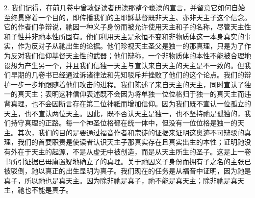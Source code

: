 2. 我们记得，在前几卷中曾敦促读者研读那整个亵渎的宣言，并留意它如何自始至终贯穿着一个目的，即传播我们的主耶稣基督既非天主、亦非天主子这个信念。它的作者们争辩说，祂因一种义子身份而被允许使用天主和子的名称，尽管天主性和子性并非祂本性所固有。他们利用天主是永恒不变和非物质体这一本身真实的事实，作为反对子从祂出生的论据。他们珍视天主圣父是独一的那真理，只是为了作为反对我们信仰基督天主性的武器；他们辩称，一个非物质体的本性不能被合理地设想为产生另一个，并且我们信独一天主与宣认来自天主的天主是不一致的。但我们早期的几卷书已经通过诉诸律法和先知驳斥并挫败了他们的这个论点。我们的辩护一步一步地跟随着他们攻击的进程。我们陈述了来自天主的天主，同时宣认了独一的真天主；表明这种信仰表述既不会因为将单独一位位格归于独一的真天主而违背真理，也不会因断言存在第二位神祇而增加信仰。因为我们既不宣认一位孤立的天主，也不宣认两位天主。因此，既不否认天主是独一，也不坚持祂是孤独的，我们持守真理的正路。每一个神圣位格都在统一体中，但没有一位位格是独一的天主。其次，我们的目的是要通过福音作者和宗徒的证据来证明这奥迹不可辩驳的真理，我们的首要职责是使读者认识天主子那真实存在且真实出生的本性；证明祂没有外在于天主的起源，不是从虚无中被创造，而是从天主所生的圣子。这是上一卷书所引证据已毋庸置疑地确立了的真理。关于祂因义子身份而拥有子之名的主张已被驳倒，祂以真正的出生显明为真子。我们现在的任务是从福音中证明，因为祂是真子，所以祂也是真天主。因为除非祂是真子，祂不能是真天主；除非祂是真天主，祂也不能是真子。\par

